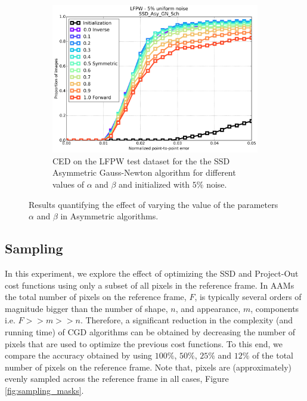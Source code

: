 \begin{figure}[h!]
	\begin{subfigure}{0.48\textwidth}
	    \includegraphics[width=\textwidth]{experiments/alpha/ced_ssd_asy_gn_5.png}
	    \caption{CED on the LFPW test dataset for the the SSD Asymmetric Gauss-Newton algorithm for different values of $\alpha$ and $\beta$ and initialized with $5\%$ noise.}
	    \label{fig:ced_po_inv_gn}
	\end{subfigure}
	\caption{Results quantifying the effect of varying the value of the parameters $\alpha$ and $\beta$ in Asymmetric algorithms.}
	\label{fig:alpha}
\end{figure}



\subsection{Sampling}

In this experiment, we explore the effect of optimizing the SSD and Project-Out cost functions using only a subset of all pixels in the reference frame. In AAMs the total number of pixels on the reference frame, $F$, is typically several orders of magnitude bigger than the number of shape, $n$, and appearance, $m$, components i.e. $F>>m>>n$. Therefore, a significant reduction in the complexity (and running time) of CGD algorithms can be obtained by decreasing the number of pixels that are used to optimize the previous cost functions. To this end, we compare the accuracy obtained by using $100\%$, $50\%$, $25\%$ and $12\%$ of the total number of pixels on the reference frame. Note that, pixels are (approximately) evenly sampled across the reference frame in all cases, Figure \ref{fig:sampling_masks}.

